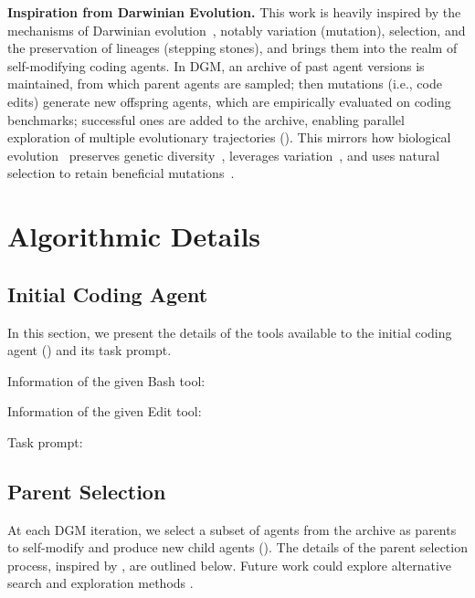 \textbf{Inspiration from Darwinian Evolution.}
This work is heavily inspired by the mechanisms of Darwinian evolution~\citep{darwin2023origin}, notably variation (mutation), selection, and the preservation of lineages (stepping stones), and brings them into the realm of self-modifying coding agents. In DGM, an archive of past agent versions is maintained, from which parent agents are sampled; then mutations (i.e., code edits) generate new offspring agents, which are empirically evaluated on coding benchmarks; successful ones are added to the archive, enabling parallel exploration of multiple evolutionary trajectories (). This mirrors how biological evolution~\citep{edwards2000genetical, wright1932roles} preserves genetic diversity~\citep{mayr1982growth}, leverages variation~\citep{kimura1979neutral}, and uses natural selection to retain beneficial mutations~\citep{dobzhansky1970genetics}.

\section{Algorithmic Details}

\subsection{Initial Coding Agent}
\label{app:initial-agent}

In this section, we present the details of the tools available to the initial coding agent () and its task prompt.

Information of the given Bash tool:


Information of the given Edit tool:


Task prompt:


\subsection{Parent Selection}
\label{app:parent-select}

At each DGM iteration, we select a subset of agents from the archive as parents to self-modify and produce new child agents (). The details of the parent selection process, inspired by \citet{ecoffet2019go}, are outlined below. Future work could explore alternative search and exploration methods \citep{coulom2006efficient, silver2016mastering, herr2025llm}.


